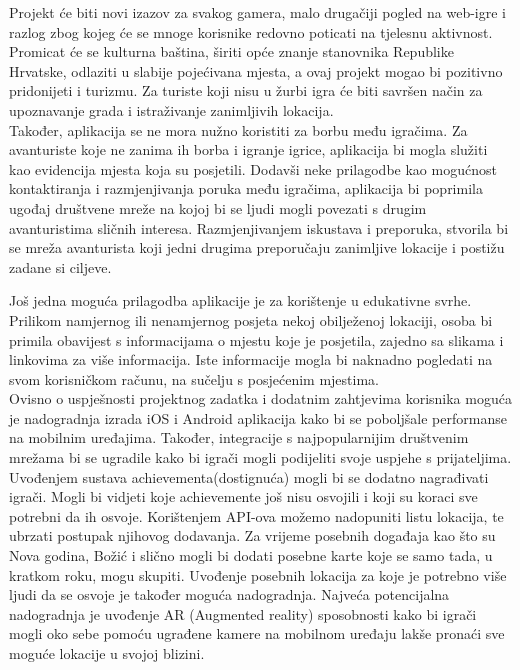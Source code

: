 		\textnormal{Projekt će biti novi izazov za svakog gamera, malo drugačiji pogled na web-igre i razlog zbog kojeg će se mnoge korisnike redovno poticati na tjelesnu aktivnost. Promicat će se kulturna baština, širiti opće znanje stanovnika Republike Hrvatske, odlaziti u slabije pojećivana mjesta, a ovaj projekt mogao bi pozitivno pridonijeti i turizmu. Za turiste koji nisu u žurbi igra će biti savršen način za upoznavanje grada i istraživanje zanimljivih lokacija.}\\
		
		\textnormal{Također, aplikacija se ne mora nužno koristiti za borbu među igračima. Za avanturiste koje ne zanima ih borba i igranje igrice, aplikacija bi mogla služiti kao evidencija mjesta koja su posjetili. Dodavši neke prilagodbe kao mogućnost kontaktiranja i razmjenjivanja poruka među igračima, aplikacija  bi poprimila ugođaj društvene mreže na kojoj bi se ljudi mogli povezati s drugim avanturistima sličnih interesa. Razmjenjivanjem iskustava i preporuka, stvorila bi se mreža avanturista koji jedni drugima preporučaju zanimljive lokacije i postižu zadane si ciljeve.}
		
		\textnormal{Još jedna moguća  prilagodba aplikacije je za korištenje u edukativne svrhe. Prilikom namjernog ili nenamjernog posjeta nekoj obilježenoj lokaciji, osoba bi primila obavijest s informacijama o mjestu koje je posjetila, zajedno sa slikama i linkovima za više informacija. Iste informacije mogla bi naknadno pogledati na svom korisničkom računu, na sučelju s posjećenim mjestima.}\\
		
		\textnormal{Ovisno o uspješnosti projektnog zadatka i dodatnim zahtjevima korisnika moguća je nadogradnja izrada iOS i Android aplikacija kako bi se poboljšale performanse na mobilnim uređajima. Također, integracije s najpopularnijim društvenim mrežama bi se ugradile kako bi igrači mogli podijeliti svoje uspjehe s prijateljima. Uvođenjem sustava achievementa(dostignuća) mogli bi se dodatno nagrađivati igrači. Mogli bi vidjeti koje achievemente još nisu osvojili i koji su koraci sve potrebni da ih osvoje. Korištenjem API-ova možemo nadopuniti listu lokacija, te ubrzati postupak njihovog dodavanja. Za vrijeme posebnih događaja kao što su Nova godina, Božić i slično mogli bi dodati posebne karte koje se samo tada, u kratkom roku, mogu skupiti. Uvođenje posebnih lokacija za koje je potrebno više ljudi da se osvoje je također moguća nadogradnja. Najveća potencijalna nadogradnja je uvođenje AR (Augmented reality) sposobnosti kako bi igrači mogli oko sebe pomoću ugrađene kamere na mobilnom uređaju lakše pronaći sve moguće lokacije u svojoj blizini.}\\
		
